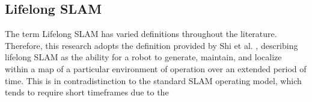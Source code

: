 \subsection{Lifelong SLAM}

The term Lifelong SLAM has varied definitions throughout the literature. Therefore, this research adopts the definition provided by Shi et al. \cite{shiAreWeReady2020}, describing lifelong SLAM as the ability for a robot to generate, maintain, and localize within a map of a particular environment of operation over an extended period of time. This is in contradistinction to the standard SLAM operating model, which tends to require short timeframes due to the 